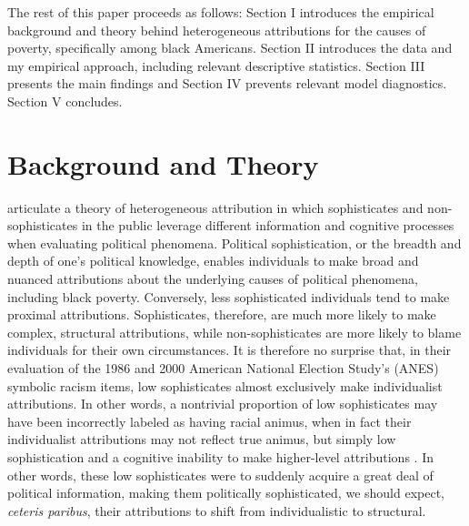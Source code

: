\documentclass[12pt]{paper}
\begin{document}
The rest of this paper proceeds as follows: Section I introduces the empirical background and theory behind heterogeneous attributions for the causes of poverty, specifically among black Americans. Section II introduces the data and my empirical approach, including relevant descriptive statistics. Section III presents the main findings and Section IV prevents relevant model diagnostics. Section V concludes.

\section{Background and Theory}
\cite{gomez_political_2001, gomez_rethinking_2006} articulate a theory of heterogeneous attribution in which sophisticates and non-sophisticates in the public leverage different information and cognitive processes when evaluating political phenomena. Political sophistication, or the breadth and depth of one's political knowledge, enables individuals to make broad and nuanced attributions about the underlying causes of political phenomena, including black poverty. Conversely, less sophisticated individuals tend to make proximal attributions. Sophisticates, therefore, are much more likely to make complex, structural attributions, while non-sophisticates are more likely to blame individuals for their own circumstances. It is therefore no surprise that, in their evaluation of the 1986 and 2000 American National Election Study's (ANES) symbolic racism items, low sophisticates almost exclusively make individualist attributions. In other words, a nontrivial proportion of low sophisticates may have been incorrectly labeled as having racial animus, when in fact their individualist attributions may not reflect true animus, but simply low sophistication and a cognitive inability to make higher-level attributions \citep{gomez_rethinking_2006}. In other words, these low sophisticates were to suddenly acquire a great deal of political information, making them politically sophisticated, we should expect, \textit{ceteris paribus}, their attributions to shift from individualistic to structural.
\end{document}
